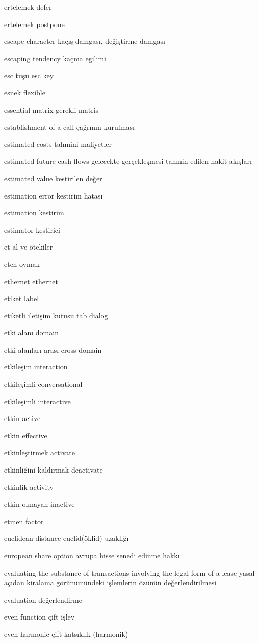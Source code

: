 \documentclass[12pt,fleqn]{article}\usepackage{../../common}
\begin{document}
ertelemek defer

ertelemek postpone

escape character kaçış damgası, değiştirme damgası

escaping tendency kaçma egilimi

esc tuşu esc key

esnek flexible

essential matrix gerekli matris

establishment of a call çağrının kurulması

estimated costs tahmini maliyetler

estimated future cash flows gelecekte gerçekleşmesi tahmin edilen nakit akışları

estimated value kestirilen değer

estimation error kestirim hatası

estimation kestirim

estimator kestirici

et al ve ötekiler

etch oymak

ethernet ethernet

etiket label

etiketli iletişim kutusu tab dialog

etki alanı domain

etki alanları arası cross-domain

etkileşim interaction

etkileşimli conversational

etkileşimli interactive

etkin active

etkin effective

etkinleştirmek activate

etkinliğini kaldırmak deactivate

etkinlik activity

etkin olmayan inactive

etmen factor

euclidean distance euclid(öklid) uzaklığı

european share option avrupa hisse senedi edinme hakkı

evaluating the substance of transactions involving the legal form of a lease yasal açıdan kiralama görünümündeki işlemlerin özünün değerlendirilmesi

evaluation değerlendirme

even function çift işlev

even harmonic çift katsıklık (harmonik)
\end{document}
